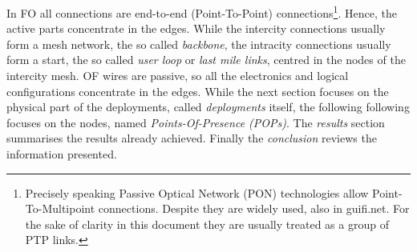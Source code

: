 In FO all connections are end-to-end (Point-To-Point) connections\footnote{Precisely speaking Passive Optical Network (PON) technologies allow Point-To-Multipoint connections. Despite they are widely used, also in guifi.net. For the sake of clarity in this document they are usually treated as a group of PTP links.}. Hence, the active parts concentrate in the edges. While the intercity connections usually form a mesh network, the so called \emph{backbone}, the intracity connections usually form a start, the so called \emph{user loop} or \emph{last mile links}, centred in the nodes of the intercity mesh. OF wires are passive, so all the electronics and logical configurations concentrate in the edges. While the next section focuses on the physical part of the deployments, called \emph{deployments} itself, the following following focuses on the nodes, named \emph{Points-Of-Presence (POPs)}. The \emph{results} section summarises the results already achieved. Finally the \emph{conclusion} reviews the information presented.